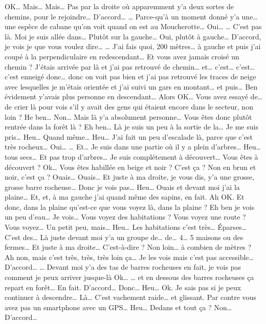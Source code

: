 \begin{dialogue*}
  \Sec OK…
  \Req Mais… Mais… Pas par la droite où apparemment y'a deux sortes de
  chemins, pour le rejoindre…
  \Sec {} D'accord…
  \Req … Parce-qu’à un moment donné y'a une… une espèce de cabane
  qu'on voit quand on est au Moucherotte…
  \Sec {} Oui…
  \Req … C'est pas là. Moi je suis allée dans… Plutôt sur la gauche…
  \Sec {} Oui, plutôt à gauche… D'accord,
  je vois je que vous voulez dire…
  \Req … J'ai fais quoi, 200 mètres… à gauche et puis j'ai coupé à la
  perpendiculaire en redescendant…
  \Sec {} Et vous avez jamais croisé un
  chemin ?
  \Req J'étais arrivée par là et j'ai pas retrouvé de chemin… et…
  c'est… c'est… c'est enneigé donc… donc on voit pas bien et j'ai pas
  retrouvé les traces de neige avec lesquelles je m'étais orientée et
  j'ai suivi un gars en montant… et puis… Ben évidement y'avais plus
  personne en descendant…
  \Sec {} Alors OK… Vous avez essayé de… de
  crier là pour vois s'il y avait des gens qui étaient encore dans le
  secteur, non loin ?
  \Req He ben… Non… Mais là y'a absolument personne…
  \Sec {} Vous êtes donc plutôt rentrée dans
  la forêt là ?
  \Req Eh ben… Là je suis un peu à la sortie de la… Je me suis pris…
  Heu… Quand même… Heu… J'ai fait un peu d'escalade là, parce que
  c'est très rocheux…
  \Sec {} Oui…
  \Req … Et… Je suis dans une partie où il y a plein d'arbres… Heu…
  tous secs… Et pas trop d'arbres… Je suis complétement à découvert…
  \Sec {} Vous êtes à découvert ? Ok… Vous
  êtes habillée en beige et noir ? C'est ça ? Non en brun et noir,
  c'est ça ?
  \Req Ouais… Ouais… Et juste à ma droite, je vous dis, y'a une
  grosse, grosse barre rocheuse… Donc je vois pas… Heu… Ouais et
  devant moi j'ai la plaine… Et, et, à ma gauche j'ai quand même des
  sapins, en fait.
  \Sec Ah OK. Et donc, dans la plaine qu'est-ce que vous voyez là,
  dans la plaine ?
  \Req Eh ben je vois un peu d'eau… Je vois…
  \Sec {} Vous voyez des habitations ? Vous
  voyez une route ? Vous voyez…
  \Req Un petit peu, mais… Heu… Les habitations c'est très… Éparses…
  C'est des… Là juste devant moi y'a un groupe de… de… 4… 5 maisons ou
  des fermes… Et juste à ma droite…
  \Sec {} C'est-à-dire ? Non loin… à combien
  de mètres ?
  \Req Ah non, mais c'est très, très, très loin ça… Je les vois mais
  c'est pas accessible…
  \Sec {} D'accord…
  \Req … Devant moi y'a des tas de barres rocheuses en fait, je vois
  pas comment je peux arriver jusque-là
  \Sec {} Ok…
  \Req … et en dessous des barres rocheuses ça repart en forêt… En
  fait.
  \Sec D'accord… Donc… Heu… Ok.
  \Req Je sais pas si je peux continuer à descendre… Là… C'est
  vachement raide… et glissant.
  \Sec Par contre vous avez pas un smartphone avec un GPS… Heu… Dedans
  et tout ça ?
  \Req Non…
  \Sec D'accord…
\end{dialogue*}
